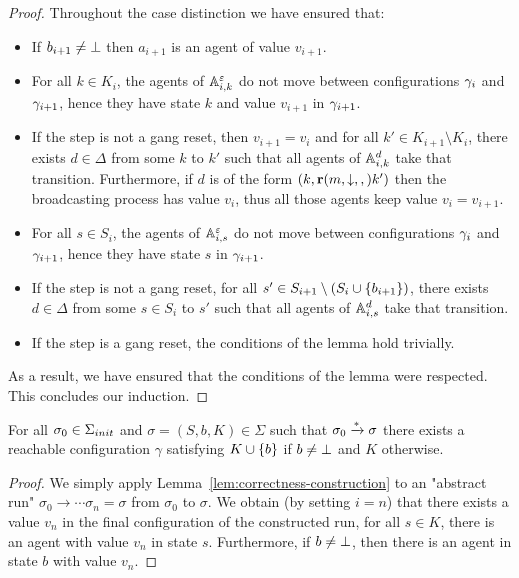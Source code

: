 \begin{proof}
Throughout the case distinction we have ensured that:
\begin{itemize}
	\item If $b_{i+1} \neq \bot$ then $a_{i+1}$ is an agent of value $v_{i+1}$.
	
	\item For all $k \in K_{i}$, the agents of $\mathbb{A}_{i,k}^\varepsilon$ do not move between configurations $\gamma_{i}$ and $\gamma_{i+1}$, hence they have state $k$ and value $v_{i+1}$ in $\gamma_{i+1}$.
	
	\item If the step is not a gang reset, then $v_{i+1} = v_i$ and for all $k' \in K_{i+1} \setminus K_i$, there exists $d \in \Delta$ from some $k$ to $k'$ such that all agents of $\mathbb{A}_{i,k}^d$ take that transition. Furthermore, if $d$ is of the form $(k,\textbf{r}(m, \downarrow, ,)k')$ then the broadcasting process has value $v_i$, thus all those agents keep value $v_i = v_{i+1}$. 
	
	\item For all $s \in S_{i}$, the agents of $\mathbb{A}_{i,s}^\varepsilon$ do not move between configurations $\gamma_{i}$ and $\gamma_{i+1}$, hence they have state $s$ in $\gamma_{i+1}$.
	
	\item If the step is not a gang reset, for all $s' \in S_{i+1} \setminus (S_i \cup \{b_{i+1}\})$, there exists $d \in \Delta$ from some $s \in S_i$ to $s'$ such that all agents of $\mathbb{A}_{i,s}^d$ take that transition.
	
	\item If the step is a gang reset, the conditions of the lemma hold trivially.
\end{itemize}

As a result, we have ensured that the conditions of the lemma were respected.
This concludes our induction.
\end{proof}
\fi

\begin{corollary}
	\label{cor:soundness}
	For all $\sigma_0 \in \aconfiginitset$ and $\sigma = (S, b, K) \in \Sigma$ such that $\sigma_0 \xrightarrow{*} \sigma$ there exists a reachable configuration $\gamma$ satisfying $K \cup \{b\}$ if $b \neq \bot$ and $K$ otherwise.
\end{corollary}

\ifproofs
\begin{proof}
	We simply apply Lemma~\ref{lem:correctness-construction} to an "abstract run" $\sigma_0 \to \cdots \sigma_n = \sigma$ from $\sigma_0$ to $\sigma$.
	We obtain (by setting $i = n$) that there exists a value $v_n$ in the final configuration of the constructed run, for all $s \in K$, there is an agent with value $v_n$ in state $s$. Furthermore, if $b \neq \bot$, then there is an agent in state $b$ with value $v_n$.  
\end{proof}
\fi
